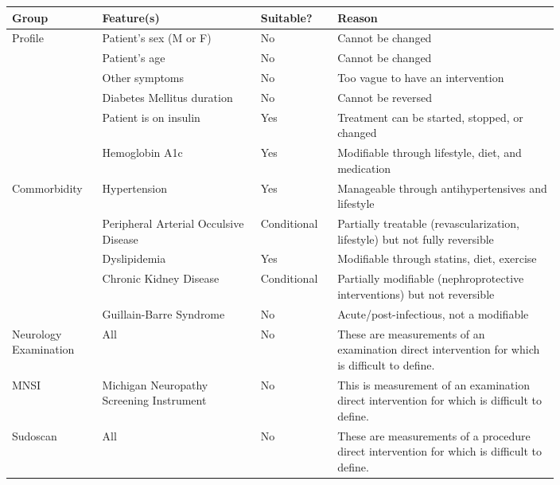 \documentclass[pdflatex,sn-vancouver-num]{sn-jnl}
\begin{document}
\begin{table}[h!]
\centering
\footnotesize
\begin{tabular}{p{0.1\linewidth} p{0.25\linewidth} p{0.1\linewidth} p{0.35\linewidth}}
\toprule
\textbf{Group} &  \textbf{Feature(s)} & \textbf{Suitable?} & \textbf{Reason} \\
\midrule
Profile      & Patient's sex (M or F) & No & Cannot be changed \\
             & Patient's age & No & Cannot be changed \\
             & Other symptoms & No & Too vague to have an intervention \\
             & Diabetes Mellitus duration & No & Cannot be reversed \\
             & Patient is on insulin  & Yes & Treatment can be started, stopped, or changed \\
             & Hemoglobin A1c & Yes & Modifiable through lifestyle, diet, and medication \\
\midrule
Commorbidity & Hypertension & Yes & Manageable through antihypertensives and lifestyle \\
             & Peripheral Arterial Occulsive Disease & Conditional & Partially treatable (revascularization, lifestyle) but not fully reversible \\
             & Dyslipidemia & Yes & Modifiable through statins, diet, exercise\\
             & Chronic Kidney Disease & Conditional & Partially modifiable (nephroprotective interventions) but not reversible \\
             & Guillain-Barre Syndrome & No & Acute/post-infectious, not a modifiable \\
\midrule
Neurology \newline Examination & All  & No &  These are measurements of an examination direct intervention for which is difficult to define. \\
\midrule
MNSI            & Michigan Neuropathy \newline  Screening Instrument & No & This is measurement of an examination direct intervention for which is difficult to define.   \\
\midrule
Sudoscan & All & No &  These are measurements of a procedure direct intervention for which is difficult to define.\\
\bottomrule
\end{tabular}

\end{table}
\end{document}

